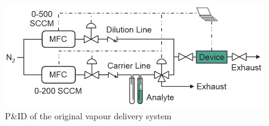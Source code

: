 \documentclass[
  a4paper,
]{scrbook}
\begin{document}
\begin{figure}

{\centering \includegraphics[width=1\textwidth,height=\textheight]{figures/ch5/PID_V0.png}

}

\caption{\label{fig-original-pid}P\&ID of the original vapour delivery
system}

\end{figure}
\end{document}

